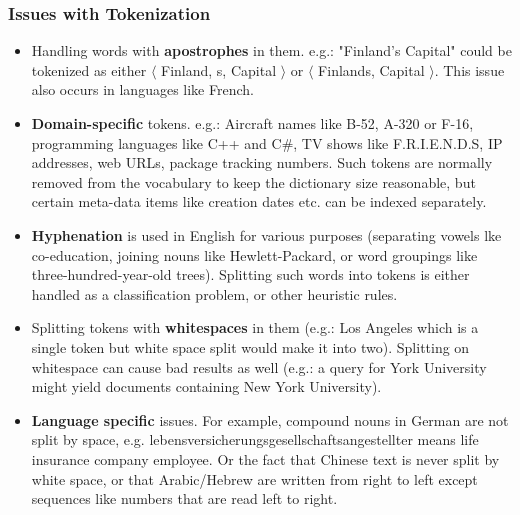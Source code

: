 \documentclass{article}
\begin{document}
\subsubsection{Issues with Tokenization}
\begin{itemize}
    \item Handling words with \textbf{apostrophes} in them. e.g.: "Finland's Capital" could be tokenized as either $\langle$ Finland, s, Capital $\rangle$ or $\langle$ Finlands, Capital $\rangle$. This issue also occurs in languages like French. 
    
    \item \textbf{Domain-specific} tokens. e.g.: Aircraft names like B-52, A-320 or F-16, programming languages like C++ and C\#, TV shows like F.R.I.E.N.D.S, IP addresses, web URLs, package tracking numbers. Such tokens are normally removed from the vocabulary to keep the dictionary size reasonable, but certain meta-data items like creation dates etc. can be indexed separately. 
    
    \item \textbf{Hyphenation} is used in English for various purposes (separating vowels lke co-education, joining nouns like Hewlett-Packard, or word groupings like three-hundred-year-old trees). Splitting such words into tokens is either handled as a classification problem, or other heuristic rules.
    
    \item Splitting tokens with \textbf{whitespaces} in them (e.g.: Los Angeles which is a single token but white space split would make it into two). Splitting on whitespace can cause bad results as well (e.g.: a query for York University might yield documents containing New York University). 
    
    \item \textbf{Language specific} issues. For example, compound nouns in German are not split by space, e.g. lebensversicherungsgesellschaftsangestellter means life insurance company employee. Or the fact that Chinese text is never split by white space, or that Arabic/Hebrew are written from right to left except sequences like numbers that are read left to right. 
\end{itemize}
\end{document}
